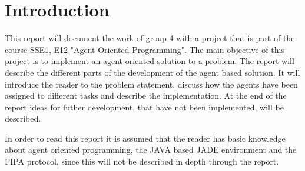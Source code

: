 \chapter{Introduction}



This report will document the work of group 4 with a project that is part of the course SSE1, E12 "Agent Oriented Programming". The main objective of this project is to implement an agent oriented solution to a problem. The report will describe the different parts of the development of the agent based solution. It will introduce the reader to the problem statement, discuss how the agents have been assigned to different tasks and describe the implementation. At the end of the report ideas for futher development, that have not been implemented, will be described.

In order to read this report it is assumed that the reader has basic knowledge about agent oriented programming, the JAVA based JADE environment and the FIPA protocol, since this will not be described in depth through the report.